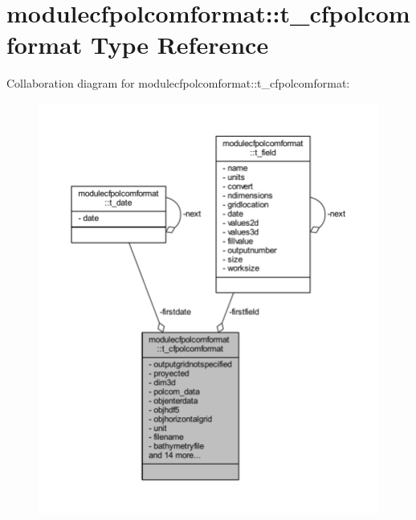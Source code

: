 \hypertarget{structmodulecfpolcomformat_1_1t__cfpolcomformat}{}\section{modulecfpolcomformat\+:\+:t\+\_\+cfpolcomformat Type Reference}
\label{structmodulecfpolcomformat_1_1t__cfpolcomformat}


Collaboration diagram for modulecfpolcomformat\+:\+:t\+\_\+cfpolcomformat\+:\nopagebreak
\begin{figure}[H]
\begin{center}
\leavevmode
\includegraphics[width=350pt]{structmodulecfpolcomformat_1_1t__cfpolcomformat__coll__graph}
\end{center}
\end{figure}
